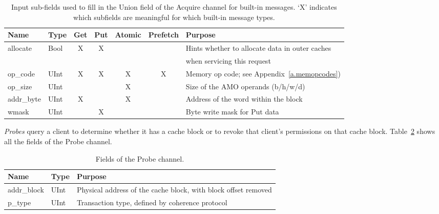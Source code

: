 \begin{table}[]
\begin{center}
\begin{tabular}{|l|l|c|c|c|c|l|}
    \hline
Name       & Type & Get & Put & Atomic & Prefetch & Purpose \\ \hline \hline
allocate   & Bool & X   & X   &        &          & Hints whether to allocate data in outer caches \\
           &      &     &     &        &          & when servicing this request \\ \hline
op\_code   & UInt & X   & X   & X      & X        & Memory op code; see Appendix~\ref{a.memopcodes}) \\ \hline
op\_size   & UInt &     &     & X      &          & Size of the AMO operands (b/h/w/d) \\ \hline
addr\_byte & UInt & X   &     & X      &          & Address of the word within the block \\ \hline
wmask      & UInt &     & X   &        &          & Byte write mask for Put data \\ \hline
\end{tabular}
\end{center}
\caption{Input sub-fields used to fill in the Union field of the Acquire channel for built-in messages.
`X' indicates which  subfields are meaningful for which built-in message types.
}
\label{tab:union}
\end{table}



\emph{Probes} query a client to determine whether it has a cache block or to revoke that client's  permissions on that cache block.
Table~\ref{tab:probe} shows all the fields of the Probe channel.

\begin{table}[]
\begin{center}
\begin{tabular}{|l|l|l|}
    \hline
    Name & Type & Purpose \\ \hline \hline
addr\_block & UInt & Physical address of the cache block, with block offset removed \\ \hline
p\_type & UInt & Transaction type, defined by coherence protocol \\ \hline
\end{tabular}
\end{center}
\caption{Fields of the Probe channel.}
\label{tab:probe}
\end{table}


